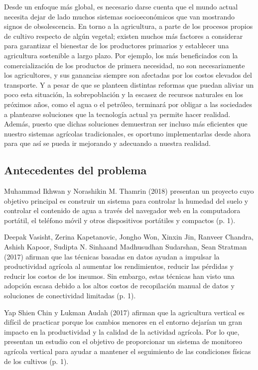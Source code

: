 \documentclass{report}
\begin{document}
Desde un enfoque más global, es necesario darse cuenta que el mundo actual
necesita dejar de lado muchos sistemas socioeconómicos que van mostrando signos
de obsolescencia. En torno a la agricultura, a parte de los procesos propios de
cultivo respecto de algún vegetal; existen muchos más factores a considerar para
garantizar el bienestar de los productores primarios y establecer una
agricultura sostenible a largo plazo. Por ejemplo, los más beneficiados con la
comercialización de los productos de primera necesidad, no son necesariamente
los agricultores, y sus ganancias siempre son afectadas por los costos elevados
del transporte. Y a pesar de que se planteen distintas reformas que puedan
aliviar un poco esta situación, la sobrepoblación y la escasez de recursos
naturales en los próximos años, como el agua o el petróleo, terminará por
obligar a las sociedades a plantearse soluciones que la tecnología actual ya
permite hacer realidad. Además, puesto que dichas soluciones demuestran ser
incluso más eficientes que nuestro sistemas agrícolas tradicionales, es oportuno
implementarlas desde ahora para que así se pueda ir mejorando y adecuando a
nuestra realidad.
\subsection{Antecedentes del problema}
Muhammad Ikhwan y Norashikin M. Thamrin (2018) presentan un proyecto cuyo
objetivo principal es construir un sistema para controlar la humedad del suelo y
controlar el contenido de agua a través del navegador web en la computadora
portátil, el teléfono móvil y otros dispositivos portátiles y compactos (p. 1).

Deepak Vasisht, Zerina Kapetanovic, Jongho Won, Xinxin Jin, Ranveer Chandra,
Ashish Kapoor, Sudipta N. Sinhaand Madhusudhan Sudarshan, Sean Stratman (2017)
afirman que las técnicas basadas en datos ayudan a impulsar la productividad
agrícola al aumentar los rendimientos, reducir las pérdidas y reducir los costos
de los insumos. Sin embargo, estas técnicas han visto una adopción escasa debido
a los altos costos de recopilación manual de datos y soluciones de conectividad
limitadas (p. 1).

Yap Shien Chin y Lukman Audah (2017) afirman que la agricultura vertical es
difícil de practicar porque los cambios menores en el entorno dejarían un gran
impacto en la productividad y la calidad de la actividad agrícola. Por lo que,
presentan un estudio con el objetivo de proporcionar un sistema de monitoreo
agrícola vertical para ayudar a mantener el seguimiento de las condiciones
físicas de los cultivos (p. 1).
\end{document}
